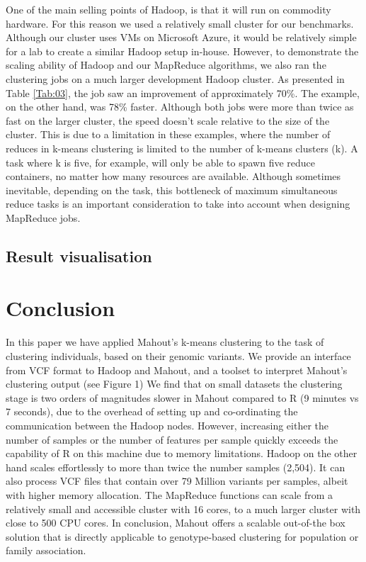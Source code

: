 \documentclass{bioinfo}
\begin{document}
One of the main selling points of Hadoop, is that it will run on commodity hardware. For this reason we used a relatively small cluster for our benchmarks. Although our cluster uses VMs on Microsoft Azure, it would be relatively simple for a lab to
create a similar Hadoop setup in-house. However, to demonstrate the scaling ability of Hadoop and our MapReduce algorithms, we also ran the clustering jobs on a much larger development Hadoop cluster. As presented in Table \ref{Tab:03}, the \OnePhaseone{} job saw an improvement of approximately 70\%.
The \FullPhasethree{} example, on the other hand, was 78\% faster.
Although both jobs were more than twice as fast on the larger cluster, the speed doesn't scale relative to the size of the cluster. This is due to a limitation in these examples, where the number of reduces in k-means clustering is limited to the number of k-means clusters (k).
A task where k is five, for example, will only be able to spawn five reduce containers, no matter how many resources are available. Although sometimes inevitable, depending on the task, this bottleneck of maximum simultaneous reduce tasks is an important consideration to take into account when designing MapReduce jobs. 



\subsection*{Result visualisation}





\section*{Conclusion}
In this paper we have applied Mahout's k-means clustering to the task of clustering individuals, based on their genomic variants. 
We provide an interface from VCF format to Hadoop and Mahout, and a toolset to interpret Mahout's clustering output (see Figure 1)
We find that on small datasets the clustering stage is two orders of magnitudes slower in Mahout compared to R (9 minutes vs 7 seconds), due to the overhead of setting up and co-ordinating the communication between the Hadoop nodes. 
However, increasing either the number of samples or the number of features per sample quickly exceeds the capability of R on this machine due to memory limitations.
Hadoop on the other hand scales effortlessly to more than twice the number samples (2,504). It can also process VCF files that contain over 79 Million variants per samples, albeit with higher memory allocation.
The MapReduce functions can scale from a relatively small and accessible cluster with 16 cores, to a much larger cluster with close to 500 CPU cores. 
In conclusion, Mahout offers a scalable out-of-the box solution that is directly applicable to genotype-based clustering for population or family association. 
\end{document}
